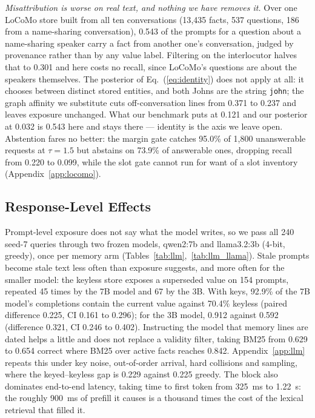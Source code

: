 \documentclass{article} %
\begin{document}
\emph{Misattribution is worse on real text, and nothing we have removes it.} Over one LoCoMo store built from all ten conversations (13{,}435 facts, 537 questions, 186 from a name-sharing conversation), 0.543 of the prompts for a question about a name-sharing speaker carry a fact from another one's conversation, judged by provenance rather than by any value label. Filtering on the interlocutor halves that to 0.301 and here costs no recall, since LoCoMo's questions are about the speakers themselves. The posterior of Eq.~(\ref{eq:identity}) does not apply at all: it chooses between distinct stored entities, and both Johns are the string \texttt{john}; the graph affinity we substitute cuts off-conversation lines from 0.371 to 0.237 and leaves exposure unchanged. What our benchmark puts at 0.121 and our posterior at 0.032 is 0.543 here and stays there --- identity is the axis we leave open. Abstention fares no better: the margin gate catches 95.0\% of 1{,}800 unanswerable requests at $\tau=1.5$ but abstains on 73.9\% of answerable ones, dropping recall from 0.220 to 0.099, while the slot gate cannot run for want of a slot inventory (Appendix~\ref{app:locomo}).

\subsection{Response-Level Effects}
\label{sec:llm}

Prompt-level exposure does not say what the model writes, so we pass all 240 seed-7 queries through two frozen models, qwen2:7b and llama3.2:3b (4-bit, greedy), once per memory arm (Tables~\ref{tab:llm},~\ref{tab:llm_llama}). Stale prompts become stale text less often than exposure suggests, and more often for the smaller model: the keyless store exposes a superseded value on 154 prompts, repeated 45 times by the 7B model and 67 by the 3B. With keys, 92.9\% of the 7B model's completions contain the current value against 70.4\% keyless (paired difference 0.225, CI 0.161 to 0.296); for the 3B model, 0.912 against 0.592 (difference 0.321, CI 0.246 to 0.402). Instructing the model that memory lines are dated helps a little and does not replace a validity filter, taking BM25 from 0.629 to 0.654 correct where BM25 over active facts reaches 0.842. Appendix~\ref{app:llm} repeats this under key noise, out-of-order arrival, hard collisions and sampling, where the keyed--keyless gap is 0.229 against 0.225 greedy. The block also dominates end-to-end latency, taking time to first token from 325~ms to 1.22~s: the roughly 900~ms of prefill it causes is a thousand times the cost of the lexical retrieval that filled it.
\end{document}
